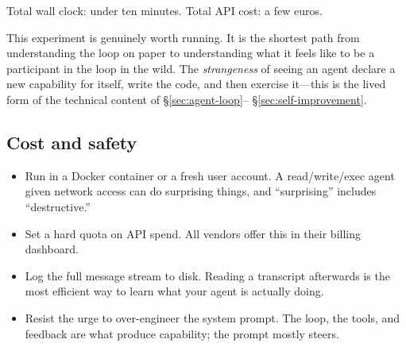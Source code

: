 Total wall clock: under ten minutes.  Total API cost: a few
euros.

\begin{remark}
  This experiment is genuinely worth running.  It is the
  shortest path from understanding the loop on paper to
  understanding what it feels like to be a participant in
  the loop in the wild.  The \emph{strangeness} of seeing an
  agent declare a new capability for itself, write the code,
  and then exercise it---this is the lived form of the
  technical content of \S\ref{sec:agent-loop}--%
  \S\ref{sec:self-improvement}.
\end{remark}

\subsection{Cost and safety}

\begin{itemize}
  \item Run in a Docker container or a fresh user account.
    A read/write/exec agent given network access can do
    surprising things, and ``surprising'' includes
    ``destructive.''
  \item Set a hard quota on API spend.  All vendors offer
    this in their billing dashboard.
  \item Log the full message stream to disk.  Reading a
    transcript afterwards is the most efficient way to learn
    what your agent is actually doing.
  \item Resist the urge to over-engineer the system prompt.
    The loop, the tools, and feedback are what produce
    capability; the prompt mostly steers.
\end{itemize}

